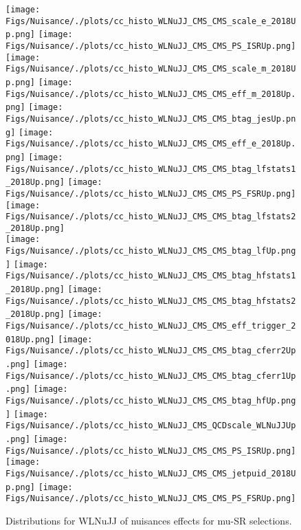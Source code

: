 \begin{figure*}[htbp]  
\centering 
\texttt{[image: Figs/Nuisance/./plots/cc\_histo\_WLNuJJ\_CMS\_CMS\_scale\_e\_2018Up.png]}
\texttt{[image: Figs/Nuisance/./plots/cc\_histo\_WLNuJJ\_CMS\_CMS\_PS\_ISRUp.png]}
\texttt{[image: Figs/Nuisance/./plots/cc\_histo\_WLNuJJ\_CMS\_CMS\_scale\_m\_2018Up.png]}
\texttt{[image: Figs/Nuisance/./plots/cc\_histo\_WLNuJJ\_CMS\_CMS\_eff\_m\_2018Up.png]}
\texttt{[image: Figs/Nuisance/./plots/cc\_histo\_WLNuJJ\_CMS\_CMS\_btag\_jesUp.png]}
\texttt{[image: Figs/Nuisance/./plots/cc\_histo\_WLNuJJ\_CMS\_CMS\_eff\_e\_2018Up.png]}
\texttt{[image: Figs/Nuisance/./plots/cc\_histo\_WLNuJJ\_CMS\_CMS\_btag\_lfstats1\_2018Up.png]}
\texttt{[image: Figs/Nuisance/./plots/cc\_histo\_WLNuJJ\_CMS\_CMS\_PS\_FSRUp.png]}
\texttt{[image: Figs/Nuisance/./plots/cc\_histo\_WLNuJJ\_CMS\_CMS\_btag\_lfstats2\_2018Up.png]}\\
\texttt{[image: Figs/Nuisance/./plots/cc\_histo\_WLNuJJ\_CMS\_CMS\_btag\_lfUp.png]}
\texttt{[image: Figs/Nuisance/./plots/cc\_histo\_WLNuJJ\_CMS\_CMS\_btag\_hfstats1\_2018Up.png]}
\texttt{[image: Figs/Nuisance/./plots/cc\_histo\_WLNuJJ\_CMS\_CMS\_btag\_hfstats2\_2018Up.png]}
\texttt{[image: Figs/Nuisance/./plots/cc\_histo\_WLNuJJ\_CMS\_CMS\_eff\_trigger\_2018Up.png]}
\texttt{[image: Figs/Nuisance/./plots/cc\_histo\_WLNuJJ\_CMS\_CMS\_btag\_cferr2Up.png]}
\texttt{[image: Figs/Nuisance/./plots/cc\_histo\_WLNuJJ\_CMS\_CMS\_btag\_cferr1Up.png]}
\texttt{[image: Figs/Nuisance/./plots/cc\_histo\_WLNuJJ\_CMS\_CMS\_btag\_hfUp.png]}
\texttt{[image: Figs/Nuisance/./plots/cc\_histo\_WLNuJJ\_CMS\_QCDscale\_WLNuJJUp.png]}
\texttt{[image: Figs/Nuisance/./plots/cc\_histo\_WLNuJJ\_CMS\_CMS\_PS\_ISRUp.png]}\\
\texttt{[image: Figs/Nuisance/./plots/cc\_histo\_WLNuJJ\_CMS\_CMS\_jetpuid\_2018Up.png]}
\texttt{[image: Figs/Nuisance/./plots/cc\_histo\_WLNuJJ\_CMS\_CMS\_PS\_FSRUp.png]}
\\ 
\caption{ 
   Distributions for WLNuJJ of nuisances effects for mu-SR selections.
} 
\label{fig:WLNuJJ_mu_SR} 
\end{figure*} 




